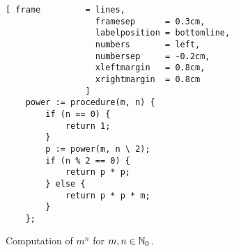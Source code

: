 \begin{figure}[!h]
  \centering
\begin{Verbatim}[ frame         = lines, 
                  framesep      = 0.3cm, 
                  labelposition = bottomline,
                  numbers       = left,
                  numbersep     = -0.2cm,
                  xleftmargin   = 0.8cm,
                  xrightmargin  = 0.8cm
                ]
    power := procedure(m, n) {
        if (n == 0) {
            return 1;
        }
        p := power(m, n \ 2);
        if (n % 2 == 0) {
            return p * p;
        } else {
            return p * p * m;
        }
    };
\end{Verbatim}
\vspace*{-0.3cm}
  \caption{Computation of $m^n$ for $m,n \in {\mathbb N}_0$.}
  \label{fig:power.stlx}
\end{figure} 

